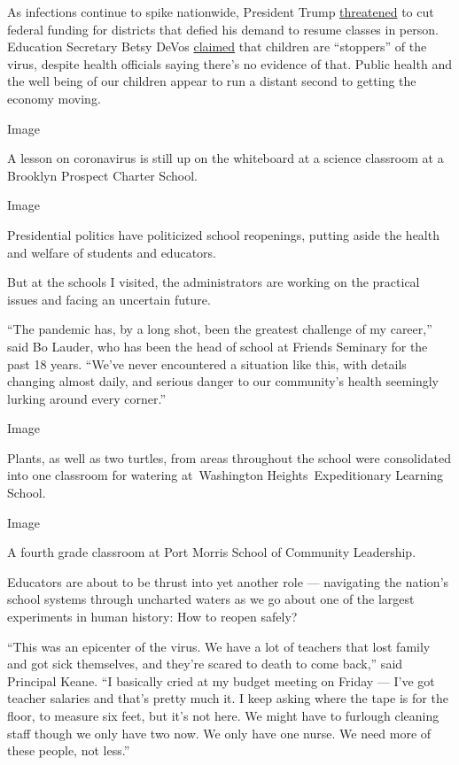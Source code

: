 As infections continue to spike nationwide, President Trump
\href{https://twitter.com/realDonaldTrump/status/1280853299600789505?s=20}{threatened}
to cut federal funding for districts that defied his demand to resume
classes in person. Education Secretary Betsy DeVos
\href{https://www.washingtonpost.com/politics/2020/07/23/devoss-claim-that-children-are-stoppers-covid-19/}{claimed}
that children are ``stoppers'' of the virus, despite health officials
saying there's no evidence of that. Public health and the well being of
our children appear to run a distant second to getting the economy
moving.

Image

A lesson on coronavirus is still up on the whiteboard at a science
classroom at a Brooklyn Prospect Charter School.

Image

Presidential politics have politicized school reopenings, putting aside
the health and welfare of students and educators.

But at the schools I visited, the administrators are working on the
practical issues and facing an uncertain future.

``The pandemic has, by a long shot, been the greatest challenge of my
career,'' said Bo Lauder, who has been the head of school at Friends
Seminary for the past 18 years. ``We've never encountered a situation
like this, with details changing almost daily, and serious danger to our
community's health seemingly lurking around every corner.''

Image

Plants, as well as two turtles, from areas throughout the school were
consolidated into one classroom for watering at~Washington
Heights~Expeditionary Learning School.

Image

A fourth grade classroom at Port Morris School of Community Leadership.~

Educators are about to be thrust into yet another role --- navigating
the nation's school systems through uncharted waters as we go about one
of the largest experiments in human history: How to reopen safely?

``This was an epicenter of the virus. We have a lot of teachers that
lost family and got sick themselves, and they're scared to death to come
back,'' said Principal Keane. ``I basically cried at my budget meeting
on Friday --- I've got teacher salaries and that's pretty much it. I
keep asking where the tape is for the floor, to measure six feet, but
it's not here. We might have to furlough cleaning staff though we only
have two now. We only have one nurse. We need more of these people, not
less.''

